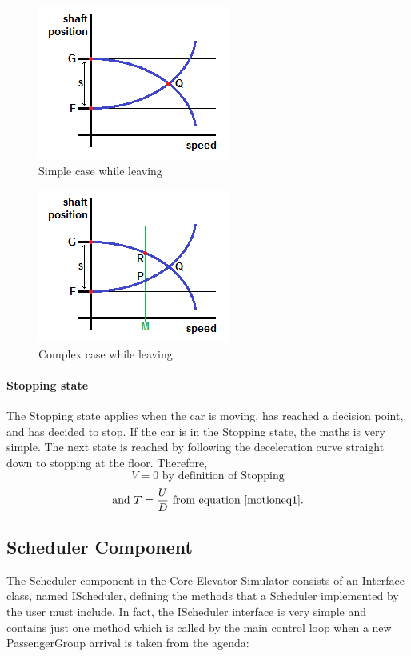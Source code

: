 \documentclass{UoYCSproject}
\begin{document}
\begin{figure} [h]
	\centering
	\includegraphics{leaving_simp.png}
	\caption{Simple case while leaving}
	\label{leavingsimp}
\end{figure}

\begin{figure} [h]
	\centering
	\includegraphics{leaving_comp.png}
	\caption{Complex case while leaving}
	\label{leavingcomp}
\end{figure}

\paragraph{Stopping state}

The Stopping state applies when the car is moving, has reached a decision point, and has decided to stop.  If the car is in the Stopping state, the maths is very simple.  The next state is reached by following the deceleration curve straight down to stopping at the floor.  Therefore,
\[ V=0 \text{ by definition of Stopping} \]
\[ \text{and } T=\frac{U}{D} \text{ from equation \ref{motioneq1}.} \]

\subsection{Scheduler Component}

The Scheduler component in the Core Elevator Simulator consists of an Interface class, named IScheduler, defining the methods that a Scheduler implemented by the user must include.  In fact, the IScheduler interface is very simple and contains just one method which is called by the main control loop when a new PassengerGroup arrival is taken from the agenda:
\end{document}
